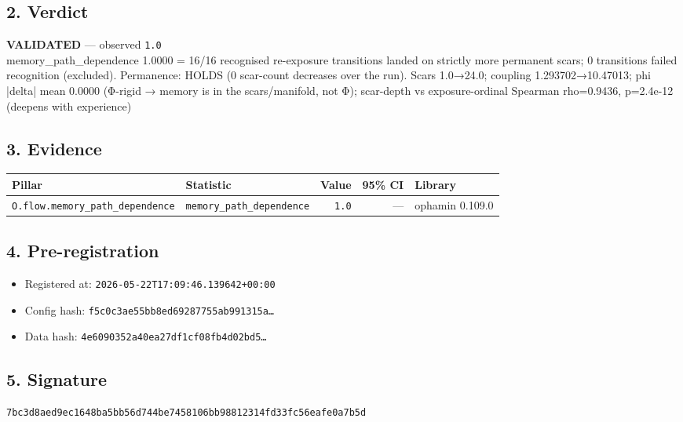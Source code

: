 \documentclass{article}
\begin{document}
\subsection*{2. Verdict}
\textcolor{validated}{\textbf{VALIDATED}} --- observed \texttt{1.0}\\
memory\_path\_dependence 1.0000 = 16/16 recognised re-exposure transitions landed on strictly more permanent scars; 0 transitions failed recognition (excluded). Permanence: HOLDS (0 scar-count decreases over the run). Scars 1.0→24.0; coupling 1.293702→10.47013; phi |delta| mean 0.0000 (Φ-rigid → memory is in the scars/manifold, not Φ); scar-depth vs exposure-ordinal Spearman rho=0.9436, p=2.4e-12 (deepens with experience)
\subsection*{3. Evidence}
\begin{tabular}{llrrl}\toprule
\textbf{Pillar} & \textbf{Statistic} & \textbf{Value} & \textbf{95\% CI} & \textbf{Library} \\\midrule
\texttt{O.flow.memory\_path\_dependence} & \texttt{memory\_path\_dependence} & \texttt{1.0} & --- & ophamin 0.109.0 \\
\bottomrule\end{tabular}
\subsection*{4. Pre-registration}
\begin{itemize}
\item Registered at: \texttt{2026-05-22T17:09:46.139642+00:00}
\item Config hash: \texttt{f5c0c3ae55bb8ed69287755ab991315a\dots}
\item Data hash: \texttt{4e6090352a40ea27df1cf08fb4d02bd5\dots}
\end{itemize}
\subsection*{5. Signature}
\texttt{7bc3d8aed9ec1648ba5bb56d744be7458106bb98812314fd33fc56eafe0a7b5d}\\
\end{document}
